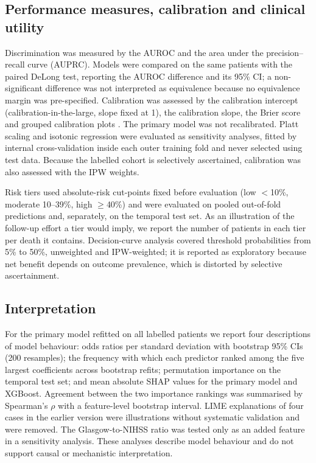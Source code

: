 \documentclass[preprint,10pt]{elsarticle}
\begin{document}
\subsection{Performance measures, calibration and clinical utility}
\label{sec:calib}
Discrimination was measured by the AUROC and the area under the precision--recall curve (AUPRC). Models were compared on the same patients with the paired DeLong test, reporting the AUROC difference and its 95\% CI; a non-significant difference was not interpreted as equivalence because no equivalence margin was pre-specified. Calibration was assessed by the calibration intercept (calibration-in-the-large, slope fixed at 1), the calibration slope, the Brier score and grouped calibration plots \cite{vancalster2019calibration,steyerberg2010assessing}. The primary model was not recalibrated. Platt scaling and isotonic regression were evaluated as sensitivity analyses, fitted by internal cross-validation inside each outer training fold and never selected using test data. Because the labelled cohort is selectively ascertained, calibration was also assessed with the IPW weights.

Risk tiers used absolute-risk cut-points fixed before evaluation (low $<$10\%, moderate 10--39\%, high $\ge$40\%) and were evaluated on pooled out-of-fold predictions and, separately, on the temporal test set. As an illustration of the follow-up effort a tier would imply, we report the number of patients in each tier per death it contains. Decision-curve analysis \cite{vickers2006decision} covered threshold probabilities from 5\% to 50\%, unweighted and IPW-weighted; it is reported as exploratory because net benefit depends on outcome prevalence, which is distorted by selective ascertainment.

\subsection{Interpretation}
\label{sec:interp-methods}
For the primary model refitted on all labelled patients we report four descriptions of model behaviour: odds ratios per standard deviation with bootstrap 95\% CIs (200 resamples); the frequency with which each predictor ranked among the five largest coefficients across bootstrap refits; permutation importance on the temporal test set; and mean absolute SHAP values \cite{lundberg2017shap} for the primary model and XGBoost. Agreement between the two importance rankings was summarised by Spearman's $\rho$ with a feature-level bootstrap interval. LIME explanations of four cases in the earlier version were illustrations without systematic validation and were removed. The Glasgow-to-NIHSS ratio was tested only as an added feature in a sensitivity analysis. These analyses describe model behaviour and do not support causal or mechanistic interpretation.
\end{document}

